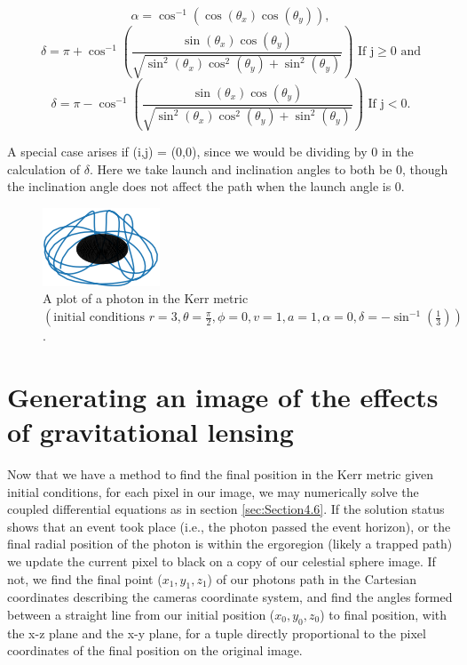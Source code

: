 \documentclass[oneside,openright,frontopenright, singlespacing]{dmathesis}
\begin{document}
\vspace{1em}
	\[\alpha = \cos^{-1}(\cos(\theta_x)\cos(\theta_y)),\]
	\[\delta = \pi+\cos^{-1}\left(\frac{\sin(\theta_x)\cos(\theta_y)}{\sqrt{\sin^2(\theta_x)\cos^2(\theta_y)+\sin^2(\theta_y)}}\right)\mbox{ If j}\geq0\mbox{ and} \]
	\[\delta = \pi-\cos^{-1}\left(\frac{\sin(\theta_x)\cos(\theta_y)}{\sqrt{\sin^2(\theta_x)\cos^2(\theta_y)+\sin^2(\theta_y)}}\right)\mbox{ If j}<0.\]

\vspace{1em}
	A special case arises if (i,j) = (0,0), since we would be dividing by 0 in the calculation of $\delta$. Here we take launch and inclination angles to both be 0, though the inclination angle does not affect the path when the launch angle is 0.

\begin{figure}[!ht]
	\centering
	\includegraphics[width=0.3\linewidth]{img/kerr-path}
	\caption{A plot of a photon in the Kerr metric $\left( \mbox{initial conditions }r=3, \theta=\frac{\pi}{2}, \phi=0, v=1, a=1, \alpha=0, \delta=-\sin^{-1}(\frac{1}{3})\right)$.}
	\label{fig:Figure4.2}
\end{figure}

\section{Generating an image of the effects of gravitational lensing}\label{sec:Section4.7}

	Now that we have a method to find the final position in the Kerr metric given initial conditions, for each pixel in our image, we may numerically solve the coupled differential equations as in section \ref{sec:Section4.6}. If the solution status shows that an event took place  (i.e., the photon passed the event horizon), or the final radial position of the photon is within the ergoregion (likely a trapped path) we update the current pixel to black on a copy of our celestial sphere image. If not, we find the final point ($x_1,y_1,z_1$) of our photons path in the Cartesian coordinates describing the cameras coordinate system, and find the angles formed between a straight line from our initial position ($x_0,y_0,z_0$) to final position, with the x-z plane and the x-y plane, for a tuple directly proportional to the pixel coordinates of the final position on the original image.
\end{document}
